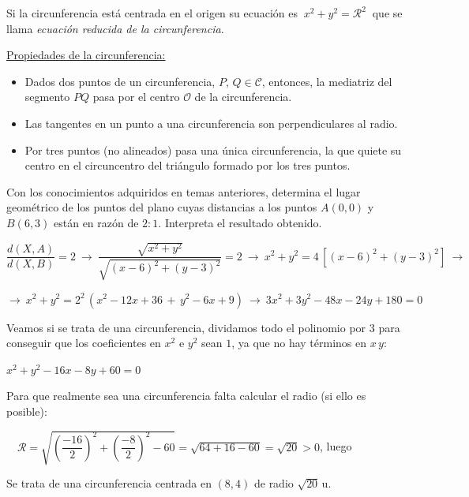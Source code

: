 Si la circunferencia está centrada en el origen su ecuación es $\ x^2+y^2=\mathcal R^2\ $ 
que se llama \emph{ecuación reducida de la circunferencia}.

\vspace{5mm} \underline{Propiedades de la circunferencia:}
\begin{itemize}
\item Dados dos puntos de un circunferencia, $P, \, Q \in \mathcal C$, entonces, la mediatriz del segmento $PQ$ pasa por el centro $\mathcal O$ de la circunferencia.	
\item Las tangentes en un punto a una circunferencia son perpendiculares al radio.
\item Por tres puntos (no alineados) pasa una única circunferencia, la que quiete su centro en el circuncentro del triángulo formado por los tres puntos.
\end{itemize}


\vspace{5mm} \begin{miejemplo}
 
Con los conocimientos adquiridos en temas anteriores, 	determina el lugar geométrico de los puntos del plano cuyas distancias a los puntos $A(0,0)$ y $B(6,3)$ están en razón de $2:1$. Interpreta el resultado obtenido.
 
 \vspace{5mm}  $\dfrac{d(X,A)}{d(X,B)}=2 \ \to \ \dfrac{\sqrt{x^2+y^2}}{\sqrt{(x-6)^2+(y-3)^2}}=2 \ \to \ x^2+y^2=4\, [(x-6)^2+(y-3)^2] \ \to \ $
 
\vspace{2mm} $\to \  x^2+y^2=2^2\, (x^2-12x+36 \, + \, y^2-6x+9) \ \to \ 3x^2+3y^2-48x-24y+180=0$
 
\vspace{2mm}  Veamos si se trata de una circunferencia, dividamos todo el polinomio por $3$ para conseguir que los coeficientes en $x^2$ e $y^2$ sean $1$, ya que no hay términos en $x\,y$:
 
\vspace{2mm}  $x^2+y^2-16x-8y+60=0\ $ 

\vspace{2mm} Para que realmente sea una circunferencia falta calcular el radio (si ello es posible): 

\vspace{2mm} $\quad \mathcal R=\sqrt{ \left(\dfrac{-16}{2} \right)^2+ \left(\dfrac{-8}{2} \right)^2 - 60} = \sqrt{64+16-60}=\sqrt{20}>0$, luego
 
\vspace{2mm}  Se trata de una circunferencia centrada en $(8,4)$ de radio $\sqrt{20}\, \mathrm{u}$.
 
 \end{miejemplo}

